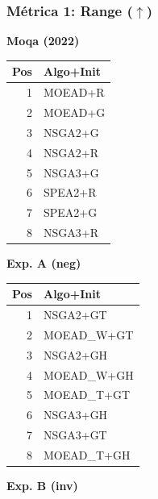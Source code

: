 \documentclass[a4paper,10pt]{article}
\begin{document}
\subsubsection{Métrica 1: Range \texorpdfstring{($\uparrow$)}{(up)}}
\begin{table}[H]
    \centering
    \begin{minipage}[t]{0.32\textwidth}
        \centering\scriptsize\textbf{Moqa (2022)}\\
        \begin{tabular}{rl}
            \toprule
            Pos & Algo+Init \\ \midrule
            1 & MOEAD+R \\
            2 & MOEAD+G \\
            3 & NSGA2+G \\
            4 & NSGA2+R \\
            5 & NSGA3+G \\
            6 & SPEA2+R \\
            7 & SPEA2+G \\
            8 & NSGA3+R \\
            \bottomrule
        \end{tabular}
    \end{minipage}
    \hfill
    \begin{minipage}[t]{0.32\textwidth}
        \centering\scriptsize\textbf{Exp. A (neg)}\\
        \begin{tabular}{rl}
            \toprule
            Pos & Algo+Init \\ \midrule
            1 & NSGA2+GT \\
            2 & MOEAD\_W+GT \\
            3 & NSGA2+GH \\
            4 & MOEAD\_W+GH \\
            5 & MOEAD\_T+GT \\
            6 & NSGA3+GH \\
            7 & NSGA3+GT \\
            8 & MOEAD\_T+GH \\
            \bottomrule
        \end{tabular}
    \end{minipage}
    \hfill
    \begin{minipage}[t]{0.32\textwidth}
        \centering\scriptsize\textbf{Exp. B (inv)}\\
        \begin{tabular}{rl}

\end{tabular}
\end{minipage}
\end{table}
\end{document}
